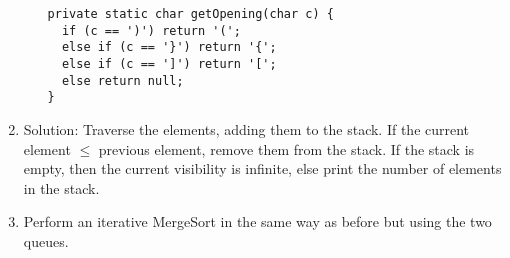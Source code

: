 \documentclass[12pt, a4paper]{article}
\begin{document}
\begin{enumerate}[Q\arabic*.]
\begin{enumerate}[(\alph*.)]
\begin{lstlisting}
private static char getOpening(char c) {
  if (c == ')') return '(';
  else if (c == '}') return '{';
  else if (c == ']') return '[';
  else return null;
}
        \end{lstlisting}
    \end{enumerate}

  \item Solution: Traverse the elements, adding them to the stack. If the current element $\leq$ previous element, remove them from the stack. If the stack is empty, then the current visibility is infinite, else print the number of elements in the stack.

  \item Perform an iterative MergeSort in the same way as before but using the two queues.
\end{enumerate}
\end{document}
